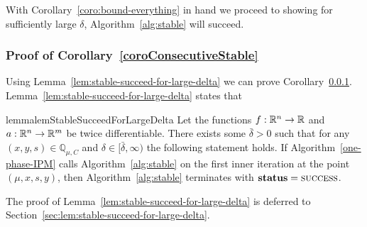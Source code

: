 \documentclass{article}
\begin{document}
With Corollary~\ref{coro:bound-everything} in hand we proceed to showing for sufficiently large $\delta$, Algorithm~\ref{alg:stable} will succeed.


\subsubsection{Proof of Corollary~\ref{coroConsecutiveStable}}\label{sec:coroConsecutiveStable}

Using Lemma~\ref{lem:stable-succeed-for-large-delta} we can prove Corollary~\ref{sec:coroConsecutiveStable}. Lemma~\ref{lem:stable-succeed-for-large-delta} states that

\begin{restatable}{lemma}{lemStableSucceedForLargeDelta} \label{lem:stable-succeed-for-large-delta}
Let the functions $f : \mathbb{R}^{n} \rightarrow \mathbb{R}$ and $a : \mathbb{R}^{n} \rightarrow \mathbb{R}^{m}$ be twice differentiable. There exists some $\bar{\delta} > 0$ such that for any $(x,y,s) \in \mathbb{Q}_{\mu,C}$ and $\delta \in [\bar{\delta}, \infty)$ the following statement holds. If Algorithm~\ref{one-phase-IPM} calls Algorithm~\ref{alg:stable} on the first inner iteration at the point $(\mu, x, s, y)$, then Algorithm~\ref{alg:stable}  terminates with $\textbf{status} = \textsc{success}$.
\end{restatable}

The proof of Lemma~\ref{lem:stable-succeed-for-large-delta} is deferred to Section~\ref{sec:lem:stable-succeed-for-large-delta}.

\coroConsecutiveStable*
\end{document}
